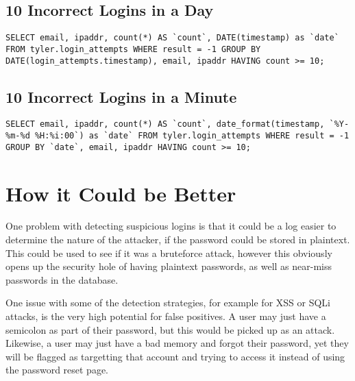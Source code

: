 \documentclass[a4paper, 11pt]{article}
\begin{document}
\subsection*{10 Incorrect Logins in a Day}
\begin{lstlisting}
SELECT email, ipaddr, count(*) AS `count`, DATE(timestamp) as `date` FROM tyler.login_attempts WHERE result = -1 GROUP BY DATE(login_attempts.timestamp), email, ipaddr HAVING count >= 10;
\end{lstlisting}

\subsection*{10 Incorrect Logins in a Minute}
\begin{lstlisting}
SELECT email, ipaddr, count(*) AS `count`, date_format(timestamp, `%Y-%m-%d %H:%i:00`) as `date` FROM tyler.login_attempts WHERE result = -1 GROUP BY `date`, email, ipaddr HAVING count >= 10;
\end{lstlisting}


\section*{How it Could be Better}
One problem with detecting suspicious logins is that it could be a log easier to determine the nature of the attacker, if the password could be stored in plaintext.  This could be used to see if it was a bruteforce attack, however this obviously opens up the security hole of having plaintext passwords, as well as near-miss passwords in the database.

One issue with some of the detection strategies, for example for XSS or SQLi attacks, is the very high potential for false positives.  A user may just have a semicolon as part of their password, but this would be picked up as an attack.  Likewise, a user may just have a bad memory and forgot their password, yet they will be flagged as targetting that account and trying to access it instead of using the password reset page.
\end{document}
